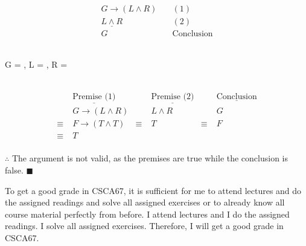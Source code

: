 \documentclass[]{article}
\begin{document}
\begin{center}
\end{center}    
\begin{align*}
    G \rightarrow (L \land R) & \quad (1) \\
    \underline{L \land R} & \quad (2) \\
    G &  \quad \text{Conclusion}
\end{align*}
\begin{center}
      \\
    G = , L = , R =  \\
     \\
\end{center}
\begin{align*}
    & \underline{\text{Premise (1)}} & & \underline{\text{Premise (2)}} & & \underline{\text{Conclusion}} \\
    & G \rightarrow (L \land R) & & L \land R & & G \\
    \equiv\; & F \rightarrow (T \land T) & \equiv\; & T & \equiv\; & F \\
    \equiv\; & T & & & & \\
\end{align*}
\begin{center}
    $\therefore$ The argument is not valid, as the premises are true while the conclusion is false. $\blacksquare$
\end{center}

\begin{question}
    To get a good grade in CSCA67, it is sufficient for me to attend lectures and do the assigned readings and solve
all assigned exercises or to already know all course material perfectly from before. I attend lectures and I do
the assigned readings. I solve all assigned exercises. Therefore, I will get a good grade in CSCA67.
\end{question}
\end{document}

